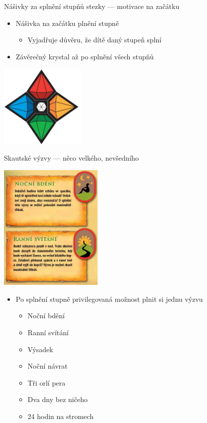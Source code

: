 \documentclass[compress,xelatex,xcolor=dvipsnames,hyperref={pdfpagelabels=false},print]{beamer}
\begin{document}
\begin{frame}{Nášivky za splnění stupňů stezky --- motivace na začátku}
\begin{itemize}
\item Nášivka na začátku plnění stupně
 \begin{itemize}
 \item Vyjadřuje důvěru, že dítě daný stupeň splní
 \end{itemize}
\item Závěrečný krystal až po splnění všech stupňů
\end{itemize}
\begin{center}
\includegraphics[height=4cm]{kameny.png}
\end{center}
\end{frame}

\begin{frame}{Skautské výzvy --- něco velkého, nevšedního}
\begin{multicols}{2}
\includegraphics[height=6.1cm]{vyzvy.png}
\begin{itemize}
\item Po splnění stupně privilegovaná možnost plnit si jednu výzvu
 \begin{itemize}
 \item Noční bdění
 \item Ranní svítání
 \item Výsadek
 \item Noční návrat
 \item Tři orlí pera
 \item Dva dny bez ničeho
 \item 24 hodin na stromech
 \end{itemize}
\end{itemize}
\end{multicols}
\end{frame}
\end{document}
